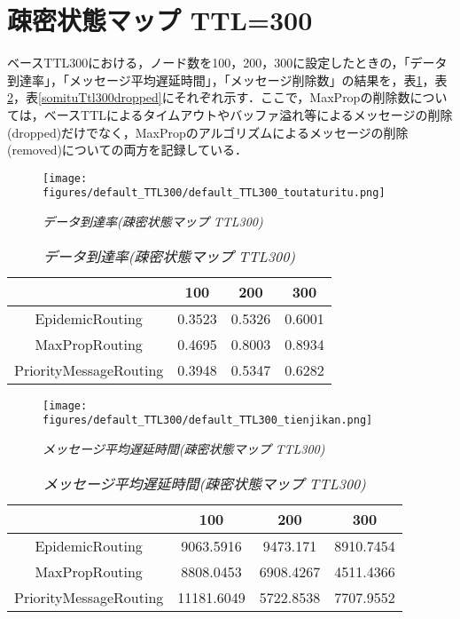 \documentclass[11pt]{icsthesis}
\begin{document}
\section{疎密状態マップ TTL=300}
ベースTTL300における，ノード数を100，200，300に設定したときの，「データ到達率」，「メッセージ平均遅延時間」，「メッセージ削除数」の結果を，表\ref{somituTtl300deliveryprob}，表\ref{somituTtl300latencyavg}，表\ref{somituTtl300dropped}にそれぞれ示す．ここで，MaxPropの削除数については，ベースTTLによるタイムアウトやバッファ溢れ等によるメッセージの削除(dropped)だけでなく，MaxPropのアルゴリズムによるメッセージの削除(removed)についての両方を記録している．

\begin{figure}[h]
\centering
\texttt{[image: figures/default\_TTL300/default\_TTL300\_toutaturitu.png]}
\caption[]{\it{データ到達率(疎密状態マップ TTL300)}}
\label{somituttl300deliveryprobgraph}
\end{figure}

\begin{table}[H]
 \begin{center}
      \caption[]{\it{データ到達率(疎密状態マップ TTL300)}}
      \label{somituTtl300deliveryprob}
      \begin{tabular}{|c|c|c|c|}
\hline
&100&200&300\\
\hline
EpidemicRouting&0.3523&0.5326&0.6001\\
\hline
MaxPropRouting&0.4695&0.8003&0.8934\\
\hline
PriorityMessageRouting&0.3948&0.5347&0.6282\\
\hline
      \end{tabular}
    \end{center}
\end{table}

\newpage

\begin{figure}[h]
\centering
\texttt{[image: figures/default\_TTL300/default\_TTL300\_tienjikan.png]}
\caption[]{\it{メッセージ平均遅延時間(疎密状態マップ TTL300)}}
\label{somituttl300latencyavggraph}
\end{figure}

\begin{table}[H]
 \begin{center}
      \caption[]{\it{メッセージ平均遅延時間(疎密状態マップ TTL300)}}
      \label{somituTtl300latencyavg}
      \begin{tabular}{|c|c|c|c|}
\hline
&100&200&300\\
\hline
EpidemicRouting&9063.5916&9473.171&8910.7454\\
\hline
MaxPropRouting&8808.0453&6908.4267&4511.4366\\
\hline
PriorityMessageRouting&11181.6049&5722.8538&7707.9552\\
\hline
      \end{tabular}
    \end{center}
\end{table}
\end{document}
